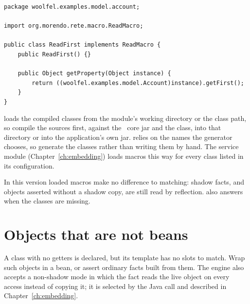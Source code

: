 \begin{lstlisting}[style=java]
package woolfel.examples.model.account;

import org.morendo.rete.macro.ReadMacro;

public class ReadFirst implements ReadMacro {
    public ReadFirst() {}

    public Object getProperty(Object instance) {
        return ((woolfel.examples.model.Account)instance).getFirst();
    }
}
\end{lstlisting}

 loads the compiled classes from the module's
working directory or the class path, so compile the sources first,
against the \Morendo\ core jar and the class, into that directory or into
the application's own jar.  relies on the names the
generator chooses, so generate the classes rather than writing them by
hand. The service module (Chapter~\ref{ch:embedding}) loads macros this
way for every class listed in its configuration.

\begin{caution}
In this version loaded macros make no difference to matching: shadow
facts, and objects asserted without a shadow copy, are still read by
reflection.  also answers  when the classes are
missing.
\end{caution}

\section{Objects that are not beans}

A class with no getters is declared, but its template has no slots to
match. Wrap such objects in a bean, or assert ordinary facts built from
them. The engine also accepts a non-shadow mode in which the fact reads
the live object on every access instead of copying it; it is selected by
the Java  call and described in
Chapter~\ref{ch:embedding}.
